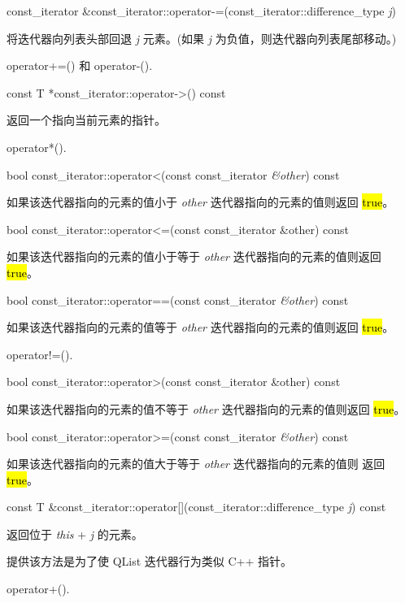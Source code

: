 const\_iterator \&const\_iterator::operator-=(const\_iterator::difference\_type \emph{j})

将迭代器向列表头部回退 \emph{j} 元素。(如果 \emph{j} 为负值，则迭代器向列表尾部移动。)

\begin{notice}[另请参见]
operator+=() 和 operator-().
\end{notice}


const T *const\_iterator::operator->() const

返回一个指向当前元素的指针。

\begin{notice}[另请参见]
operator*().
\end{notice}


bool const\_iterator::operator<(const const\_iterator \emph{\&other}) const

如果该迭代器指向的元素的值小于 \emph{other} 迭代器指向的元素的值则返回 \hl{true}。

bool const\_iterator::operator<=(const const\_iterator \&other) const

如果该迭代器指向的元素的值小于等于 \emph{other} 迭代器指向的元素的值则返回
\hl{true}。

bool const\_iterator::operator==(const const\_iterator \emph{\&other}) const

如果该迭代器指向的元素的值等于 \emph{other} 迭代器指向的元素的值则返回 \hl{true}。

\begin{notice}[另请参见]
operator!=().
\end{notice}

bool const\_iterator::operator>(const const\_iterator \&other) const

如果该迭代器指向的元素的值不等于 \emph{other} 迭代器指向的元素的值则返回 \hl{true}。

bool const\_iterator::operator>=(const const\_iterator \emph{\&other}) const

如果该迭代器指向的元素的值大于等于 \emph{other} 迭代器指向的元素的值则
返回 \hl{true}。

const T \&const\_iterator::operator[](const\_iterator::difference\_type \emph{j}) const

返回位于 \emph{this} + \emph{j} 的元素。

提供该方法是为了使 QList 迭代器行为类似 C++ 指针。

\begin{notice}[另请参见]
operator+().
\end{notice}